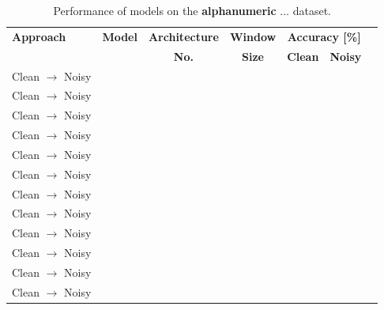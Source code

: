 \documentclass[a4paper,11pt,twoside]{report}
\theoremstyle{definition}
\begin{document}
\begin{table}[h!]
\centering
\caption{Performance of  models on the \textbf{alphanumeric} ... dataset.}
\begin{adjustbox}{max width=\textwidth}
\begin{tabular}{l|c|c|c|c|cc}
\hline
\textbf{Approach} & \textbf{Model} & \textbf{Architecture} & \textbf{Window} & \multicolumn{2}{c}{\textbf{Accuracy [\%]}} \\
\cline{5-6}
       & &   \textbf{No.}  &   \textbf{Size}   &  \textbf{Clean} & \textbf{Noisy}  \\
\hline
Clean $\rightarrow$ Noisy & &  &  &  &  \\
Clean $\rightarrow$ Noisy & &  &  &  &  \\
Clean $\rightarrow$ Noisy & &  &  &  &  \\
Clean $\rightarrow$ Noisy & &  &  &  &  \\
Clean $\rightarrow$ Noisy & &  &  &  &  \\
Clean $\rightarrow$ Noisy & &  &  &  &  \\
Clean $\rightarrow$ Noisy & &  &  &  &  \\
Clean $\rightarrow$ Noisy & &  &  &  &  \\
Clean $\rightarrow$ Noisy & &  &  &  &  \\
Clean $\rightarrow$ Noisy & &  &  &  &  \\
Clean $\rightarrow$ Noisy & &  &  &  &  \\
Clean $\rightarrow$ Noisy & &  &  &  &  \\

\hline
\end{tabular}
\end{adjustbox}
\end{table}
\end{document}
